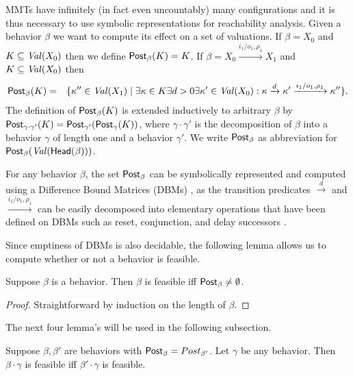 MMTs have infinitely (in fact even uncountably) many configurations and it is thus necessary to use symbolic representations
for reachability analysis. Given a behavior $\beta$ we want to compute its effect on a set of valuations. 
If $\beta =X_0$ and $K \subseteq\mathit{Val}({X_0})$ then we define $\mathsf{Post}_{\beta}(K) = K$.
If $\beta = X_0 \xrightarrow{i_1/o_1, \rho_1} X_1$ and
$K \subseteq\mathit{Val}({X_0})$ then
\begin{eqnarray*}
\mathsf{Post}_{\beta}(K) & = & \{ \kappa'' \in\mathit{Val}({X_1}) \mid \exists \kappa \in K \exists d >0 \exists \kappa' \in\mathit{Val}({X_0}) :
 \kappa \xrightarrow{d} \kappa' \xrightarrow{i_1/o_1, \rho_1} \kappa'' \}.
\end{eqnarray*}
The definition of $\mathsf{Post}_{\beta}(K)$ is extended inductively to arbitrary $\beta$ by 
$\mathsf{Post}_{\gamma \cdot \gamma'}(K) = \mathsf{Post}_{\gamma'} (\mathsf{Post}_{\gamma}(K))$, where $\gamma \cdot \gamma'$ is the decomposition of
$\beta$ into a behavior $\gamma$ of length one and a behavior $\gamma'$.
We write $\mathsf{Post}_{\beta}$ as abbreviation for $\mathsf{Post}_{\beta}(\mathit{Val}({\mathsf{Head}({\beta})}))$.

For any behavior $\beta$, the set $\mathsf{Post}_{\beta}$ can be symbolically represented and computed using a Difference Bound Matrices (DBMs)
 \cite{Di89},  as the transition predicates $\xrightarrow{d}$ and $\xrightarrow{i_1/o_1, \rho_1}$ can be easily decomposed 
into elementary operations that have been defined
on DBMs such as reset, conjunction, and delay successors \cite{BengtssonY03}.

Since emptiness of DBMs is also decidable, the following lemma allows us to compute whether or not a behavior is feasible.

\begin{lemma}
Suppose $\beta$ is a behavior. Then $\beta$ is feasible iff $\mathsf{Post}_{\beta} \neq \emptyset$.
\end{lemma}
\begin{proof}
Straightforward by induction on the length of $\beta$.
\end{proof}

The next four lemma's will be used in the following subsection.

\begin{lemma}
\label{lemma: feasibility concatenation}
Suppose $\beta, \beta'$ are behaviors with
$\mathsf{Post}_{\beta} = Post_{\beta'}$. Let $\gamma$ be any behavior.
Then $\beta \cdot \gamma$ is feasible iff $\beta' \cdot \gamma$ is feasible.
\end{lemma}

